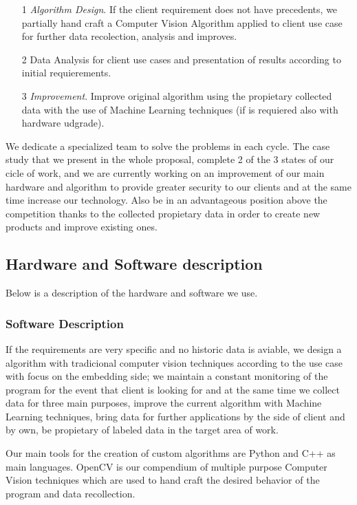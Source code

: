 \begin{itemize}

\item[1] \textit{Algorithm Design}. If the client requirement does not have precedents, we partially hand craft a Computer Vision Algorithm applied to client use case for further data recolection, analysis and improves.
\item[2] Data Analysis for client use cases and presentation of results according to initial requierements.
\item[3] \textit{Improvement}. Improve original algorithm using the  propietary collected data with the use of Machine Learning techniques (if is requiered also with hardware udgrade).
     
\end{itemize}

We dedicate a specialized team to solve the problems in each cycle. The case study that we present in the whole proposal, complete 2 of the 3 states of our cicle of work, and we are currently working on an improvement of our main hardware and algorithm to provide greater security to our clients and at the same time increase our technology. Also be in an advantageous position above the competition thanks to the collected propietary data in order to create new products and improve existing ones.



\subsection{Hardware and Software description}
Below is a description of the hardware and software we use.

\subsubsection{Software Description}
If the requirements are very specific and no historic data is aviable, we design a algorithm with tradicional computer vision techniques according to the use case with focus on the embedding side; we maintain a constant monitoring of the program for the event that client is looking for and at the same time we collect data for three main purposes, improve the current algorithm with Machine Learning techniques, bring data for further applications by the side of client and by own, be propietary of labeled data in the target area of work.

Our main tools for the creation of custom algorithms are Python and C++ as main languages. OpenCV is our compendium of multiple purpose Computer Vision techniques which are used to hand craft the desired behavior of the program and data recollection.

